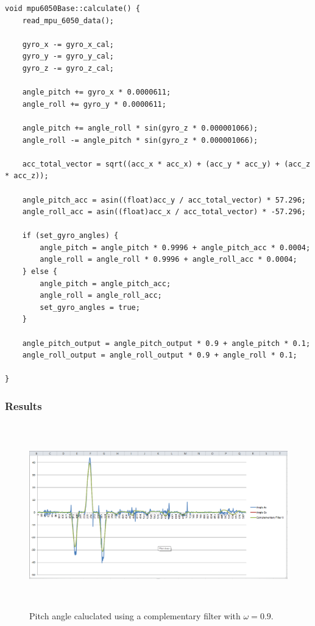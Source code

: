 \begin{lstlisting}[style=cppstyle2]
void mpu6050Base::calculate() {
	read_mpu_6050_data();
	
	gyro_x -= gyro_x_cal;
	gyro_y -= gyro_y_cal;
	gyro_z -= gyro_z_cal;
	
	angle_pitch += gyro_x * 0.0000611;
	angle_roll += gyro_y * 0.0000611;
	
	angle_pitch += angle_roll * sin(gyro_z * 0.000001066);
	angle_roll -= angle_pitch * sin(gyro_z * 0.000001066);
	
	acc_total_vector = sqrt((acc_x * acc_x) + (acc_y * acc_y) + (acc_z * acc_z));
	
	angle_pitch_acc = asin((float)acc_y / acc_total_vector) * 57.296;
	angle_roll_acc = asin((float)acc_x / acc_total_vector) * -57.296;
	
	if (set_gyro_angles) {
		angle_pitch = angle_pitch * 0.9996 + angle_pitch_acc * 0.0004;
		angle_roll = angle_roll * 0.9996 + angle_roll_acc * 0.0004;
	} else {
		angle_pitch = angle_pitch_acc;
		angle_roll = angle_roll_acc;
		set_gyro_angles = true;
	}
	
	angle_pitch_output = angle_pitch_output * 0.9 + angle_pitch * 0.1;
	angle_roll_output = angle_roll_output * 0.9 + angle_roll * 0.1;
	
}
\end{lstlisting}


\subsubsection{Results}

\begin{figure}[H]
	\centering
	\includegraphics[height=8cm]{assets/compl_filter_0.9.png}
	\caption{Pitch angle caluclated using a complementary filter with $\omega = 0.9$.}
	\label{fig:battery}
\end{figure}
